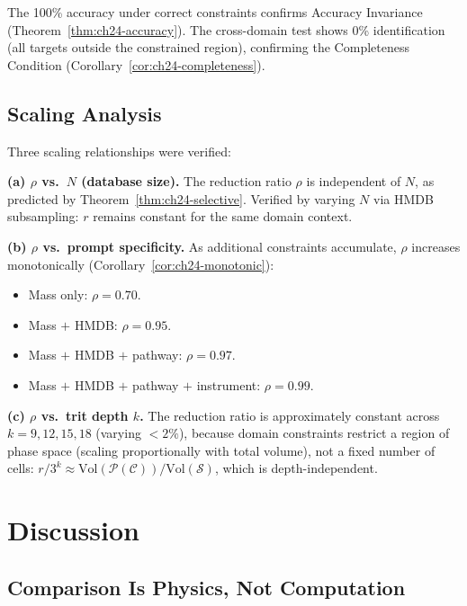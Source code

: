 The 100\% accuracy under correct constraints confirms Accuracy Invariance
(Theorem~\ref{thm:ch24-accuracy}).  The cross-domain test shows 0\%
identification (all targets outside the constrained region), confirming the
Completeness Condition (Corollary~\ref{cor:ch24-completeness}).

\subsection{Scaling Analysis}
\label{sec:ch24-scaling}

Three scaling relationships were verified:

\noindent\textbf{(a) $\rho$ vs.\ $N$ (database size).}
The reduction ratio $\rho$ is independent of $N$, as predicted by
Theorem~\ref{thm:ch24-selective}.  Verified by varying $N$ via HMDB
subsampling: $r$ remains constant for the same domain context.

\noindent\textbf{(b) $\rho$ vs.\ prompt specificity.}
As additional constraints accumulate, $\rho$ increases monotonically
(Corollary~\ref{cor:ch24-monotonic}):
\begin{itemize}[noitemsep]
  \item Mass only: $\rho = 0.70$.
  \item Mass $+$ HMDB: $\rho = 0.95$.
  \item Mass $+$ HMDB $+$ pathway: $\rho = 0.97$.
  \item Mass $+$ HMDB $+$ pathway $+$ instrument: $\rho = 0.99$.
\end{itemize}

\noindent\textbf{(c) $\rho$ vs.\ trit depth $k$.}
The reduction ratio is approximately constant across $k = 9, 12, 15, 18$
(varying $< 2\%$), because domain constraints restrict a region of phase space
(scaling proportionally with total volume), not a fixed number of cells:
$r/3^k \approx \mathrm{Vol}(\mathcal{P}(\mathcal{C}))/\mathrm{Vol}(\mathcal{S})$,
which is depth-independent.

\section{Discussion}
\label{sec:ch24-discussion}

\subsection{Comparison Is Physics, Not Computation}
\label{sec:ch24-physics}

